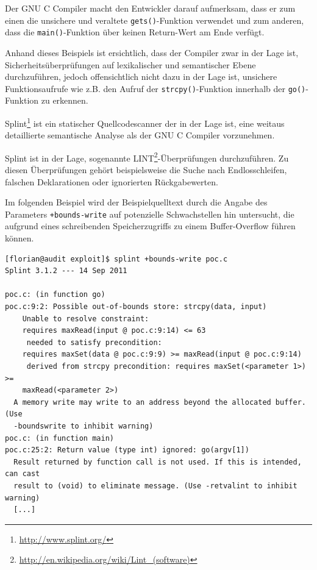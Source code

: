 Der GNU C Compiler macht den Entwickler darauf aufmerksam, dass er zum 
einen die unsichere und veraltete \texttt{gets()}-Funktion verwendet und 
zum anderen, dass die \texttt{main()}-Funktion über keinen Return-Wert am 
Ende verfügt.

Anhand dieses Beispiels ist ersichtlich, dass der Compiler zwar in der 
Lage ist, Sicherheitsüberprüfungen auf lexikalischer und semantischer 
Ebene durchzuführen, jedoch offensichtlich nicht dazu in der Lage ist, 
unsichere Funktionsaufrufe wie z.B. den Aufruf der \texttt{strcpy()}-Funktion 
innerhalb der \texttt{go()}-Funktion zu erkennen.


Splint\footnote{\url{http://www.splint.org/}} ist ein statischer Quellcodescanner 
der in der Lage ist, eine weitaus detaillierte semantische Analyse als 
der GNU C Compiler vorzunehmen.

Splint ist in der Lage, sogenannte LINT\footnote{\url{http://en.wikipedia.org/wiki/Lint\_(software)}}-Überprüfungen 
durchzuführen. Zu diesen Überprüfungen gehört beispielsweise die Suche 
nach Endlosschleifen, falschen Deklarationen oder ignorierten Rückgabewerten.

Im folgenden Beispiel wird der Beispielquelltext durch die Angabe des 
Parameters \texttt{+bounds-write} auf potenzielle Schwachstellen hin 
untersucht, die aufgrund eines schreibenden Speicherzugriffs zu einem 
Buffer-Overflow führen können.

\begin{lstlisting}[basicstyle=\ttfamily\footnotesize]
[florian@audit exploit]$ splint +bounds-write poc.c
Splint 3.1.2 --- 14 Sep 2011

poc.c: (in function go)
poc.c:9:2: Possible out-of-bounds store: strcpy(data, input)
    Unable to resolve constraint:
    requires maxRead(input @ poc.c:9:14) <= 63
     needed to satisfy precondition:
    requires maxSet(data @ poc.c:9:9) >= maxRead(input @ poc.c:9:14)
     derived from strcpy precondition: requires maxSet(<parameter 1>) >=
    maxRead(<parameter 2>)
  A memory write may write to an address beyond the allocated buffer. (Use
  -boundswrite to inhibit warning)
poc.c: (in function main)
poc.c:25:2: Return value (type int) ignored: go(argv[1])
  Result returned by function call is not used. If this is intended, can cast
  result to (void) to eliminate message. (Use -retvalint to inhibit warning)
  [...]
\end{lstlisting}

